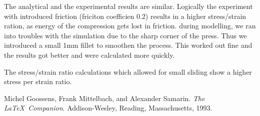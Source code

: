 \documentclass[12pt]{article}
\begin{document}
The analytical and the experimental results are similar.
Logically the experiment with introduced friction (friciton coefficien 0.2) results in a higher
stress/strain ration, as energy of the compression gets lost in friction. 
during modelling, we ran into troubles with the simulation due to the sharp corner of the press.
Thus we introduced a small 1mm fillet to smoothen the process. This worked out fine and the results 
got better and were calculated more quickly.

The stress/strain ratio calculations which allowed for small sliding show a higher stress per strain ratio.


\pagebreak
\begin{thebibliography}{9}
  Michel Goossens, Frank Mittelbach, and Alexander Samarin. 
  \textit{The \LaTeX\ Companion}. 
  Addison-Wesley, Reading, Massachusetts, 1993.
\end{thebibliography}
\end{document}
